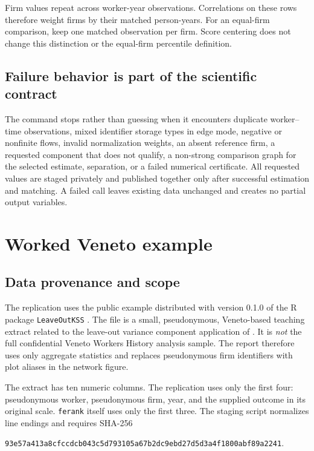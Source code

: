 \documentclass[11pt]{article}
\begin{document}
Firm values repeat across worker-year observations. Correlations on these
rows therefore weight firms by their matched person-years. For an equal-firm
comparison, keep one matched observation per firm. Score centering does not
change this distinction or the equal-firm percentile definition.

\subsection{Failure behavior is part of the scientific contract}

The command stops rather than guessing when it encounters duplicate
worker--time observations, mixed identifier storage types in edge mode,
negative or nonfinite flows, invalid normalization weights, an absent reference
firm, a requested component that does not qualify, a non-strong comparison
graph for the selected estimate, separation, or a failed numerical certificate.
All requested values are staged privately and published together only
after successful estimation and matching. A failed call leaves existing
data unchanged and creates no partial output variables.

\section{Worked Veneto example}
\label{sec:veneto}

\subsection{Data provenance and scope}

The replication uses the public example distributed with version 0.1.0 of the
R package \texttt{LeaveOutKSS} \citep{leaveoutkss2026}. The file is a small,
pseudonymous, Veneto-based teaching extract related to the leave-out variance
component application of \citet{kline2020leaveout}. It is \emph{not} the full
confidential Veneto Workers History analysis sample. The report therefore uses
only aggregate statistics and replaces pseudonymous firm identifiers with plot
aliases in the network figure.

The extract has ten numeric columns. The replication uses only the first four:
pseudonymous worker, pseudonymous firm, year, and the supplied outcome in its
original scale. \texttt{ferank} itself uses only the first three. The staging
script normalizes line endings and requires SHA-256
\begin{center}
\small\texttt{93e57a413a8cfccdcb043c5d793105a67b2dc9ebd27d5d3a4f1800abf89a2241}.
\end{center}
\end{document}
